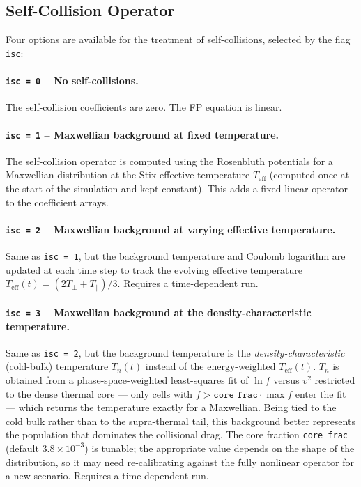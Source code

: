 \documentclass[11pt,a4paper]{article}
\begin{document}
\subsection{Self-Collision Operator}

Four options are available for the treatment of self-collisions, selected by
the flag \texttt{isc}:

\paragraph{\texttt{isc = 0} -- No self-collisions.}
The self-collision coefficients are zero.  The FP equation is linear.

\paragraph{\texttt{isc = 1} -- Maxwellian background at fixed temperature.}
The self-collision operator is computed using the Rosenbluth potentials for a
Maxwellian distribution at the Stix effective temperature $T_\mathrm{eff}$
(computed once at the start of the simulation and kept constant).  This adds
a fixed linear operator to the coefficient arrays.

\paragraph{\texttt{isc = 2} -- Maxwellian background at varying effective temperature.}
Same as \texttt{isc = 1}, but the background temperature and Coulomb
logarithm are updated at each time step to track the evolving effective
temperature $T_\mathrm{eff}(t) = (2T_\perp + T_\parallel)/3$.  Requires a
time-dependent run.

\paragraph{\texttt{isc = 3} -- Maxwellian background at the density-characteristic
temperature.}
Same as \texttt{isc = 2}, but the background temperature is the
\emph{density-characteristic} (cold-bulk) temperature $T_n(t)$ instead of the
energy-weighted $T_\mathrm{eff}(t)$.  $T_n$ is obtained from a
phase-space-weighted least-squares fit of $\ln f$ versus $v^2$ restricted to the
dense thermal core --- only cells with $f > \texttt{core\_frac}\cdot\max f$ enter
the fit --- which returns the temperature exactly for a Maxwellian.  Being tied to
the cold bulk rather than to the supra-thermal tail, this background better
represents the population that dominates the collisional drag.  The core fraction
\texttt{core\_frac} (default $3.8\times10^{-3}$) is tunable; the appropriate value
depends on the shape of the distribution, so it may need re-calibrating against the
fully nonlinear operator for a new scenario.  Requires a time-dependent run.
\end{document}
